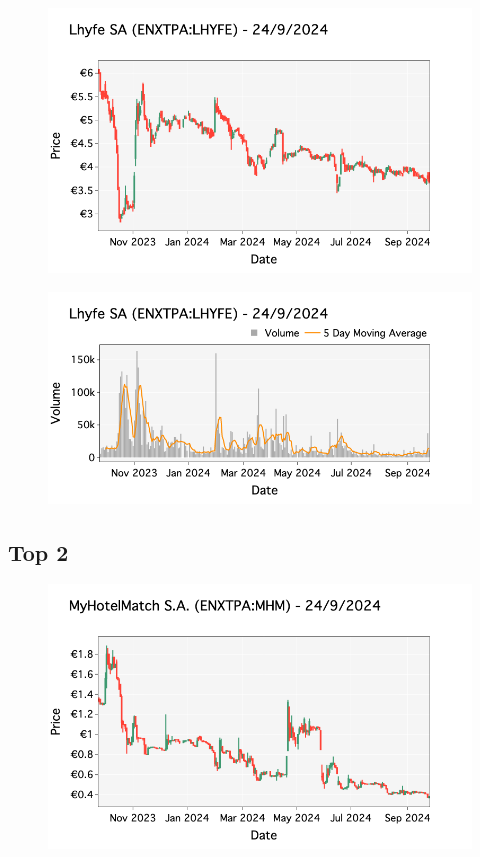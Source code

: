 \documentclass[a4paper, twocolumn, 11pt, paperequity]{gorgona}
\begin{document}
\begin{figure}[H]
    \centering
    \includegraphics[width=\columnwidth]{France/images/Top_Volume/Top_1_candlestick.png}
\end{figure}

\begin{figure}[H]
    \centering
    \includegraphics[width=\columnwidth]{France/images/Top_Volume/Top_1_volume.png}
\end{figure}

\subsection*{Top 2}

\begin{figure}[H]
    \centering
    \includegraphics[width=\columnwidth]{France/images/Top_Volume/Top_2_candlestick.png}
\end{figure}
\end{document}
